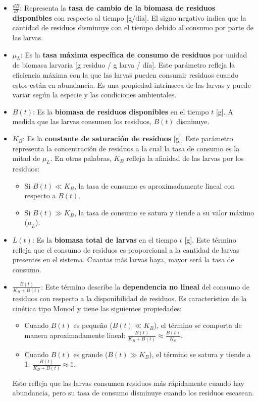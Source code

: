 \documentclass[12pt]{article}
\begin{document}
\begin{itemize}
    \item $\frac{dB}{dt}$: Representa la \textbf{tasa de cambio de la biomasa de residuos disponibles} con respecto al tiempo [g/día]. El signo negativo indica que la cantidad de residuos disminuye con el tiempo debido al consumo por parte de las larvas.

    \item $\mu_L$: Es la \textbf{tasa máxima específica de consumo de residuos} por unidad de biomasa larvaria [g residuo / g larva / día]. Este parámetro refleja la eficiencia máxima con la que las larvas pueden consumir residuos cuando estos están en abundancia. Es una propiedad intrínseca de las larvas y puede variar según la especie y las condiciones ambientales.

    \item $B(t)$: Es la \textbf{biomasa de residuos disponibles} en el tiempo $t$ [g]. A medida que las larvas consumen los residuos, $B(t)$ disminuye.

    \item $K_B$: Es la \textbf{constante de saturación de residuos} [g]. Este parámetro representa la concentración de residuos a la cual la tasa de consumo es la mitad de $\mu_L$. En otras palabras, $K_B$ refleja la afinidad de las larvas por los residuos:
    \begin{itemize}
        \item Si $B(t) \ll K_B$, la tasa de consumo es aproximadamente lineal con respecto a $B(t)$.
        \item Si $B(t) \gg K_B$, la tasa de consumo se satura y tiende a su valor máximo ($\mu_L$).
    \end{itemize}

    \item $L(t)$: Es la \textbf{biomasa total de larvas} en el tiempo $t$ [g]. Este término refleja que el consumo de residuos es proporcional a la cantidad de larvas presentes en el sistema. Cuantas más larvas haya, mayor será la tasa de consumo.

    \item $\frac{B(t)}{K_B + B(t)}$: Este término describe la \textbf{dependencia no lineal} del consumo de residuos con respecto a la disponibilidad de residuos. Es característico de la cinética tipo Monod y tiene las siguientes propiedades:
    \begin{itemize}
        \item Cuando $B(t)$ es pequeño ($B(t) \ll K_B$), el término se comporta de manera aproximadamente lineal: $\frac{B(t)}{K_B + B(t)} \approx \frac{B(t)}{K_B}$.
        \item Cuando $B(t)$ es grande ($B(t) \gg K_B$), el término se satura y tiende a 1: $\frac{B(t)}{K_B + B(t)} \approx 1$.
    \end{itemize}
    Esto refleja que las larvas consumen residuos más rápidamente cuando hay abundancia, pero su tasa de consumo disminuye cuando los residuos escasean.


\end{itemize}
\end{document}
